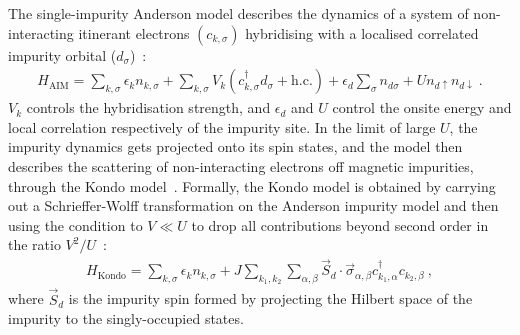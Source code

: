 The single-impurity Anderson model describes the dynamics of a system of non-interacting itinerant electrons \((c_{k,\sigma})\) hybridising with a localised correlated impurity orbital (\(d_\sigma\))~\cite{Anderson1959}:
\begin{equation}\begin{aligned}
	H_\text{AIM} = \sum_{k,\sigma}\epsilon_k n_{k,\sigma} + \sum_{k,\sigma}V_k(c^\dagger_{k,\sigma}d_\sigma + \text{h.c.}) + \epsilon_d \sum_\sigma n_{d\sigma} + Un_{d \uparrow} n_{d \downarrow}~.
\end{aligned}\end{equation}
\(V_k\) controls the hybridisation strength, and \(\epsilon_d\) and \(U\) control the onsite energy and local correlation respectively of the impurity site. In the limit of large \(U\), the impurity dynamics gets projected onto its spin states, and the model then describes the scattering of non-interacting electrons off magnetic impurities, through the Kondo model~\cite{kondo1964resistance}. Formally, the Kondo model is obtained by carrying out a Schrieffer-Wolff transformation on the Anderson impurity model and then using the condition to \(V \ll U\) to drop all contributions beyond second order in the ratio \(V^2/U\)~\cite{schrieffer1966}:
\begin{equation}\begin{aligned}
	H_\text{Kondo} = \sum_{k,\sigma}\epsilon_k n_{k,\sigma} + J \sum_{k_1,k_2}\sum_{\alpha,\beta}\vec{S}_d \cdot \vec{\sigma}_{\alpha,\beta}c^\dagger_{k_1,\alpha}c_{k_2,\beta}~,
\end{aligned}\end{equation}
where \(\vec{S}_d\) is the impurity spin formed by projecting the Hilbert space of the impurity to the singly-occupied states.

